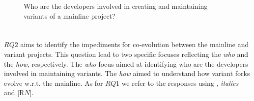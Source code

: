 \begin{figure}[ht]
\centering
\vspace{-.3cm}
    \hfill
    \hfill
    \hfill
    \caption{Who are the developers involved in creating and maintaining variants of a mainline project?}
     \label{fig:original_common}
     \vspace{-.3cm}
\end{figure}



\section{\RQTwo}
\label{sec:results-RQ2}
$RQ2$ aims  to identify the impediments for co-evolution between the mainline and variant projects.
This question lead to two specific focuses reflecting the \textit{who} and the \textit{how}, respectively. The \textit{who} focus aimed at identifying who are the developers involved in maintaining variants. The \textit{how} aimed to understand how variant forks evolve  w.r.t. the  mainline.
As for $RQ1$ we refer to the responses using , \emph{italics} and [R$N$].



